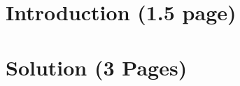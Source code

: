 





{}
\setcounter{page}{1}

\section{Introduction (1.5 page)} \label{sec: Intro}
      

\section{Solution (3 Pages)}\label{solution}
    
    
% 

\newpage 

